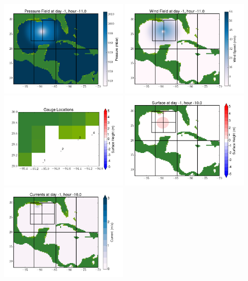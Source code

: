 \documentclass[11pt]{article}
\begin{document}
\includegraphics[width=0.475\textwidth]{frame0037fig8.png}
\vskip 10pt 
\includegraphics[width=0.475\textwidth]{frame0037fig9.png}
\includegraphics[width=0.475\textwidth]{frame0037fig10.png}
\vskip 10pt 
\includegraphics[width=0.475\textwidth]{frame0038fig1.png}
\includegraphics[width=0.475\textwidth]{frame0038fig2.png}
\end{document}
